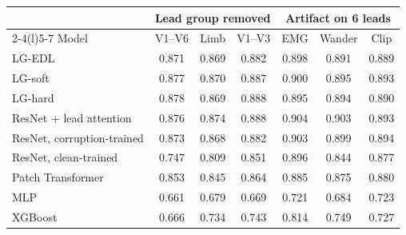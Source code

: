\begin{tabular}{@{}lcccccc@{}}
\toprule
& \multicolumn{3}{c}{Lead group removed} & \multicolumn{3}{c}{Artifact on 6 leads} \\
\cmidrule(lr){2-4}\cmidrule(l){5-7}
Model & V1--V6 & Limb & V1--V3 & EMG & Wander & Clip \\
\midrule
LG-EDL & 0.871 & 0.869 & 0.882 & 0.898 & 0.891 & 0.889 \\
LG-soft & 0.877 & 0.870 & 0.887 & 0.900 & 0.895 & 0.893 \\
LG-hard & 0.878 & 0.869 & 0.888 & 0.895 & 0.894 & 0.890 \\
ResNet + lead attention & 0.876 & 0.874 & 0.888 & 0.904 & 0.903 & 0.893 \\
ResNet, corruption-trained & 0.873 & 0.868 & 0.882 & 0.903 & 0.899 & 0.894 \\
ResNet, clean-trained & 0.747 & 0.809 & 0.851 & 0.896 & 0.844 & 0.877 \\
Patch Transformer & 0.853 & 0.845 & 0.864 & 0.885 & 0.875 & 0.880 \\
MLP & 0.661 & 0.679 & 0.669 & 0.721 & 0.684 & 0.723 \\
XGBoost & 0.666 & 0.734 & 0.743 & 0.814 & 0.749 & 0.727 \\
\bottomrule
\end{tabular}

